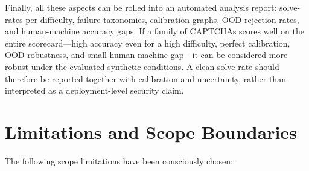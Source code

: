 \documentclass[pdflatex,sn-mathphys-num,iicol]{sn-jnl}
\begin{document}
Finally, all these aspects can be rolled into an automated analysis report: solve-rates per difficulty, failure taxonomies, calibration graphs, OOD rejection rates, and human-machine accuracy gaps. If a family of CAPTCHAs scores well on the entire scorecard---high accuracy even for a high difficulty, perfect calibration, OOD robustness, and small human-machine gap---it can be considered more robust under the evaluated synthetic conditions. A clean solve rate should therefore be reported together with calibration and uncertainty, rather than interpreted as a deployment-level security claim.
\section{Limitations and Scope Boundaries}

The following scope limitations have been consciously chosen:
\end{document}
